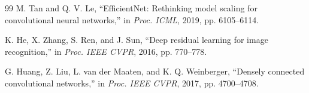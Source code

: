 \documentclass[journal]{IEEEtran}
\begin{document}
\begin{thebibliography}{99}
 M. Tan and Q. V. Le, ``EfficientNet: Rethinking model scaling for convolutional neural networks,'' in \emph{Proc. ICML}, 2019, pp. 6105--6114.

 K. He, X. Zhang, S. Ren, and J. Sun, ``Deep residual learning for image recognition,'' in \emph{Proc. IEEE CVPR}, 2016, pp. 770--778.

 G. Huang, Z. Liu, L. van der Maaten, and K. Q. Weinberger, ``Densely connected convolutional networks,'' in \emph{Proc. IEEE CVPR}, 2017, pp. 4700--4708.

\end{thebibliography}
\end{document}

